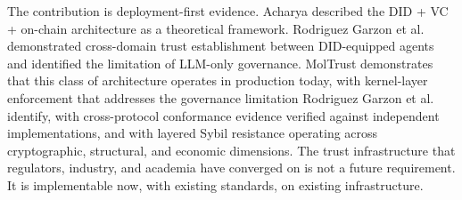The contribution is deployment-first evidence. Acharya \cite{ref17_acharya} described the DID + VC + on-chain architecture as a theoretical framework. Rodriguez Garzon et al. \cite{ref36_rodriguezgarzon} demonstrated cross-domain trust establishment between DID-equipped agents and identified the limitation of LLM-only governance. MolTrust demonstrates that this class of architecture operates in production today, with kernel-layer enforcement that addresses the governance limitation Rodriguez Garzon et al. identify, with cross-protocol conformance evidence verified against independent implementations, and with layered Sybil resistance operating across cryptographic, structural, and economic dimensions. The trust infrastructure that regulators, industry, and academia have converged on is not a future requirement. It is implementable now, with existing standards, on existing infrastructure.


